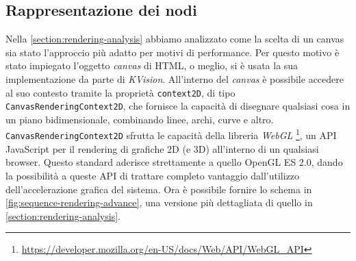 \subsection{Rappresentazione dei nodi}\label{subsection:node-representation}
Nella \cref{section:rendering-analysis} abbiamo analizzato come la scelta di un canvas sia stato l'approccio più adatto per motivi di performance. Per questo motivo è stato impiegato l'oggetto \textit{canvas} di HTML, o meglio, si è usata la sua implementazione da parte di \textit{KVision}. All'interno del \textit{canvas} è possibile accedere al suo contesto tramite la proprietà \texttt{context2D}, di tipo \texttt{CanvasRenderingContext2D}, che fornisce la capacità di disegnare qualsiasi cosa in un piano bidimensionale, combinando linee, archi, curve e altro. \texttt{CanvasRenderingContext2D} sfrutta le capacità della libreria \textit{WebGL} \footnote{\url{https://developer.mozilla.org/en-US/docs/Web/API/WebGL_API}}, un \ac{API} JavaScript per il rendering di grafiche 2D (e 3D) all'interno di un qualsiasi browser. Questo standard aderisce strettamente a quello OpenGL ES 2.0, dando la possibilità a queste \ac{API} di trattare completo vantaggio dall'utilizzo dell'accelerazione grafica del sistema.
Ora è possibile fornire lo schema in \cref{fig:sequence-rendering-advance}, una versione più dettagliata di quello in \cref{section:rendering-analysis}. 

